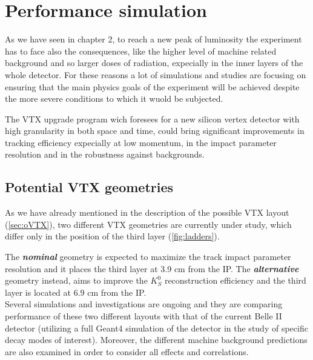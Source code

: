 \section{Performance simulation}


As we have seen in chapter 2, to reach a new peak of luminosity the experiment has to face also the consequences, like the higher level of machine related background and so larger doses of radiation, expecially in the inner layers of the whole detector. 
For these reasons a lot of simulations and studies are focusing on ensuring that the main physics goals of the experiment will be achieved despite the more severe conditions to which it wuold be subjected. 

The VTX upgrade program wich foresees for a new silicon vertex detector with high granularity in both space and time, could bring significant improvements in tracking efficiency expecially at low momentum, in the impact parameter resolution and in the robustness against backgrounds. 


\subsection{Potential VTX geometries}

As we have already mentioned in the description of the possible VTX layout (\autoref{sec:oVTX}), two different VTX geometries are currently under study, which differ only in the position of the third layer (\autoref{fig:ladders}).  

The \textit{\textbf{nominal}} geometry is expected to maximize the track impact parameter resolution and it places the third layer at 3.9 cm from the IP.
The \textit{\textbf{alternative}} geometry instead, aims to improve the $K_{S}^{0}$ reconstruction efficiency and the third layer is located at 6.9 cm from the IP.\\

Several simulations and investigations are ongoing and they are comparing performance of these two different layouts with that of the current Belle II detector (utilizing a full Geant4 simulation of the detector in the study of specific decay modes of interest). Moreover, the different machine background predictions are also examined in order to consider all effects and correlations. 

